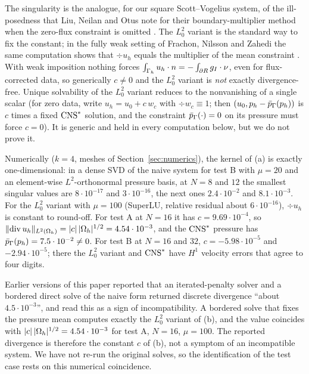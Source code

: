 The singularity is the analogue, for our square Scott--Vogelius system, of the ill-posedness that Liu, Neilan and Otus note for their boundary-multiplier method when the zero-flux constraint is omitted \cite[Remark~3.2]{LiuNeilanOtus2023}. The $L^2_0$ variant is the standard way to fix the constant; in the fully weak setting of Frachon, Nilsson and Zahedi the same computation shows that $\div u_h$ equals the multiplier of the mean constraint \cite[(5.7)--(5.9)]{FrachonNilssonZahedi2024}. With weak imposition nothing forces $\int_{\Gamma_h}u_h\cdot n=-\int_{\partial R}g_I\cdot\nu$, even for flux-corrected data, so generically $c\ne0$ and the $L^2_0$ variant is \emph{not} exactly divergence-free. Unique solvability of the $L^2_0$ variant reduces to the nonvanishing of a single scalar (for zero data, write $u_h=u_0+c\,w_c$ with $\div w_c\equiv1$; then $(u_0,p_h-\bar p_{\Gamma}(p_h))$ is $c$ times a fixed $\mathrm{CNS}^\ast$ solution, and the constraint $\bar p_{\Gamma}(\cdot)=0$ on its pressure must force $c=0$). It is generic and held in every computation below, but we do not prove it.

Numerically ($k=4$, meshes of Section~\ref{sec:numerics}), the kernel of (a) is exactly one-dimensional: in a dense SVD of the naive system for test B with $\mu=20$ and an element-wise $L^2$-orthonormal pressure basis, at $N=8$ and $12$ the smallest singular values are $8\cdot10^{-17}$ and $3\cdot10^{-16}$, the next ones $2.4\cdot10^{-2}$ and $8.1\cdot10^{-3}$. For the $L^2_0$ variant with $\mu=100$ (SuperLU, relative residual about $6\cdot10^{-16}$), $\div u_h$ is constant to round-off. For test A at $N=16$ it has $c=9.69\cdot10^{-4}$, so $\lVert \operatorname{div} u_h\rVert_{L^2(\Omega_h)}=|c|\,|\Omega_h|^{1/2}=4.54\cdot10^{-3}$, and the $\mathrm{CNS}^\ast$ pressure has $\bar p_{\Gamma}(p_h)=7.5\cdot10^{-2}\ne0$. For test B at $N=16$ and $32$, $c=-5.98\cdot10^{-5}$ and $-2.94\cdot10^{-5}$; there the $L^2_0$ variant and $\mathrm{CNS}^\ast$ have $H^1$ velocity errors that agree to four digits.

Earlier versions of this paper reported that an iterated-penalty solver and a bordered direct solve of the naive form returned discrete divergence ``about $4.5\cdot10^{-3}$'', and read this as a sign of incompatibility. A bordered solve that fixes the pressure mean computes exactly the $L^2_0$ variant of (b), and the value coincides with $|c|\,|\Omega_h|^{1/2}=4.54\cdot10^{-3}$ for test A, $N=16$, $\mu=100$. The reported divergence is therefore the constant $c$ of (b), not a symptom of an incompatible system. We have not re-run the original solves, so the identification of the test case rests on this numerical coincidence.

